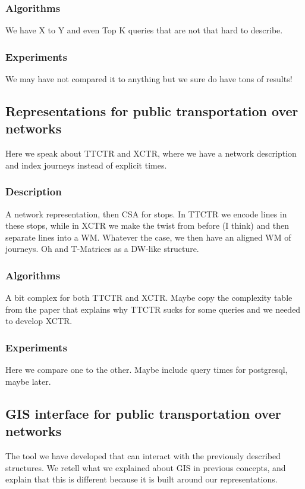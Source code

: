 \documentclass{UniVieCS_PhD} %
\begin{document}
	\subsubsection{Algorithms}
	We have X to Y and even Top K queries that are not that hard to describe.
	
	\subsubsection{Experiments}
	We may have not compared it to anything but we sure do have tons of results!
	
	\subsection{Representations for public transportation over networks}
	Here we speak about TTCTR and XCTR, where we have a network description and index journeys instead of explicit times.
	
	\subsubsection{Description}
	A network representation, then CSA for stops. In TTCTR we encode lines in these stops, while in XCTR we make the twist from before (I think) and then separate lines into a WM. Whatever the case, we then have an aligned WM of journeys. Oh and T-Matrices as a DW-like structure.
	
	\subsubsection{Algorithms}
	A bit complex for both TTCTR and XCTR. Maybe copy the complexity table from the paper that explains why TTCTR sucks for some queries and we needed to develop XCTR.
	
	\subsubsection{Experiments}
	Here we compare one to the other. Maybe include query times for postgresql, maybe later.
	
	\subsection{GIS interface for public transportation over networks}
	The tool we have developed that can interact with the previously described structures. We retell what we explained about GIS in previous concepts, and explain that this is different because it is built around our representations.
	
\end{document}
